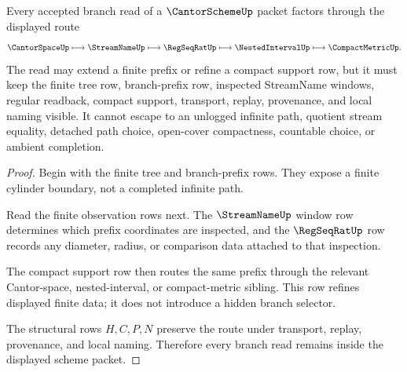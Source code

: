 \begin{theorem}
\label{thm:cantor-scheme-branch-nonescape}
Every accepted branch read of a $\CantorSchemeUp$ packet factors through the displayed route
$$
\CantorSpaceUp
\longmapsto
\StreamNameUp
\longmapsto
\RegSeqRatUp
\longmapsto
\NestedIntervalUp
\longmapsto
\CompactMetricUp .
$$
The read may extend a finite prefix or refine a compact support row, but it must keep the finite tree row, branch-prefix row, inspected StreamName windows, regular readback, compact support, transport, replay, provenance, and local naming visible. It cannot escape to an unlogged infinite path, quotient stream equality, detached path choice, open-cover compactness, countable choice, or ambient completion.
\end{theorem}
\begin{proof}
Begin with the finite tree and branch-prefix rows. They expose a finite cylinder boundary, not a completed infinite path.

Read the finite observation rows next. The $\StreamNameUp$ window row determines which prefix coordinates are inspected, and the $\RegSeqRatUp$ row records any diameter, radius, or comparison data attached to that inspection.

The compact support row then routes the same prefix through the relevant Cantor-space, nested-interval, or compact-metric sibling. This row refines displayed finite data; it does not introduce a hidden branch selector.

The structural rows $H,C,P,N$ preserve the route under transport, replay, provenance, and local naming. Therefore every branch read remains inside the displayed scheme packet.
\end{proof}




